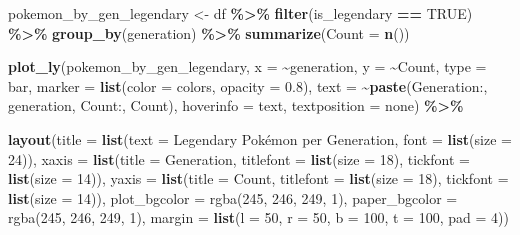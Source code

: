 \documentclass[
]{article}
\newenvironment{Shaded}{\begin{snugshade}}{\end{snugshade}}
\newcommand{\AttributeTok}[1]{\textcolor[rgb]{0.13,0.29,0.53}{#1}}
\newcommand{\ConstantTok}[1]{\textcolor[rgb]{0.56,0.35,0.01}{#1}}
\newcommand{\DecValTok}[1]{\textcolor[rgb]{0.00,0.00,0.81}{#1}}
\newcommand{\FloatTok}[1]{\textcolor[rgb]{0.00,0.00,0.81}{#1}}
\newcommand{\FunctionTok}[1]{\textcolor[rgb]{0.13,0.29,0.53}{\textbf{#1}}}
\newcommand{\NormalTok}[1]{#1}
\newcommand{\OtherTok}[1]{\textcolor[rgb]{0.56,0.35,0.01}{#1}}
\newcommand{\SpecialCharTok}[1]{\textcolor[rgb]{0.81,0.36,0.00}{\textbf{#1}}}
\newcommand{\StringTok}[1]{\textcolor[rgb]{0.31,0.60,0.02}{#1}}
\begin{document}
\begin{Shaded}
\begin{Highlighting}[]
\NormalTok{pokemon\_by\_gen\_legendary }\OtherTok{\textless{}{-}}\NormalTok{ df }\SpecialCharTok{\%\textgreater{}\%}
  \FunctionTok{filter}\NormalTok{(is\_legendary }\SpecialCharTok{==} \ConstantTok{TRUE}\NormalTok{) }\SpecialCharTok{\%\textgreater{}\%}
  \FunctionTok{group\_by}\NormalTok{(generation) }\SpecialCharTok{\%\textgreater{}\%}
  \FunctionTok{summarize}\NormalTok{(}\AttributeTok{Count =} \FunctionTok{n}\NormalTok{())}

\FunctionTok{plot\_ly}\NormalTok{(pokemon\_by\_gen\_legendary, }\AttributeTok{x =} \SpecialCharTok{\textasciitilde{}}\NormalTok{generation, }\AttributeTok{y =} \SpecialCharTok{\textasciitilde{}}\NormalTok{Count,}
        \AttributeTok{type =} \StringTok{\textquotesingle{}bar\textquotesingle{}}\NormalTok{,}
        \AttributeTok{marker =} \FunctionTok{list}\NormalTok{(}\AttributeTok{color =}\NormalTok{ colors, }\AttributeTok{opacity =} \FloatTok{0.8}\NormalTok{),}
        \AttributeTok{text =} \SpecialCharTok{\textasciitilde{}}\FunctionTok{paste}\NormalTok{(}\StringTok{\textquotesingle{}Generation:\textquotesingle{}}\NormalTok{, generation, }\StringTok{\textquotesingle{}Count:\textquotesingle{}}\NormalTok{, Count),}
        \AttributeTok{hoverinfo =} \StringTok{\textquotesingle{}text\textquotesingle{}}\NormalTok{,}
        \AttributeTok{textposition =} \StringTok{\textquotesingle{}none\textquotesingle{}}\NormalTok{) }\SpecialCharTok{\%\textgreater{}\%}
  
\FunctionTok{layout}\NormalTok{(}\AttributeTok{title =} \FunctionTok{list}\NormalTok{(}\AttributeTok{text =} \StringTok{\textquotesingle{}Legendary Pokémon per Generation\textquotesingle{}}\NormalTok{, }\AttributeTok{font =} \FunctionTok{list}\NormalTok{(}\AttributeTok{size =} \DecValTok{24}\NormalTok{)),}
       \AttributeTok{xaxis =} \FunctionTok{list}\NormalTok{(}\AttributeTok{title =} \StringTok{\textquotesingle{}Generation\textquotesingle{}}\NormalTok{, }\AttributeTok{titlefont =} \FunctionTok{list}\NormalTok{(}\AttributeTok{size =} \DecValTok{18}\NormalTok{), }\AttributeTok{tickfont =} \FunctionTok{list}\NormalTok{(}\AttributeTok{size =} \DecValTok{14}\NormalTok{)),}
       \AttributeTok{yaxis =} \FunctionTok{list}\NormalTok{(}\AttributeTok{title =} \StringTok{\textquotesingle{}Count\textquotesingle{}}\NormalTok{, }\AttributeTok{titlefont =} \FunctionTok{list}\NormalTok{(}\AttributeTok{size =} \DecValTok{18}\NormalTok{), }\AttributeTok{tickfont =} \FunctionTok{list}\NormalTok{(}\AttributeTok{size =} \DecValTok{14}\NormalTok{)),}
       \AttributeTok{plot\_bgcolor =} \StringTok{\textquotesingle{}rgba(245, 246, 249, 1)\textquotesingle{}}\NormalTok{,}
       \AttributeTok{paper\_bgcolor =} \StringTok{\textquotesingle{}rgba(245, 246, 249, 1)\textquotesingle{}}\NormalTok{,}
       \AttributeTok{margin =} \FunctionTok{list}\NormalTok{(}\AttributeTok{l =} \DecValTok{50}\NormalTok{, }\AttributeTok{r =} \DecValTok{50}\NormalTok{, }\AttributeTok{b =} \DecValTok{100}\NormalTok{, }\AttributeTok{t =} \DecValTok{100}\NormalTok{, }\AttributeTok{pad =} \DecValTok{4}\NormalTok{))}
\end{Highlighting}
\end{Shaded}
\end{document}
